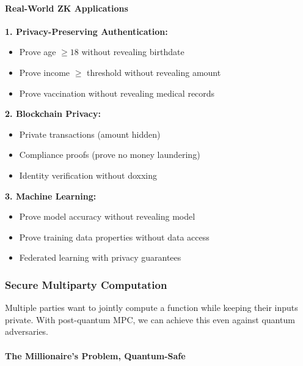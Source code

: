\documentclass[11pt,a4paper]{article}
\begin{document}
\paragraph{Real-World ZK Applications}

\textbf{1. Privacy-Preserving Authentication:}
\begin{itemize}
    \item Prove age $\geq 18$ without revealing birthdate
    \item Prove income $\geq$ threshold without revealing amount
    \item Prove vaccination without revealing medical records
\end{itemize}

\textbf{2. Blockchain Privacy:}
\begin{itemize}
    \item Private transactions (amount hidden)
    \item Compliance proofs (prove no money laundering)
    \item Identity verification without doxxing
\end{itemize}

\textbf{3. Machine Learning:}
\begin{itemize}
    \item Prove model accuracy without revealing model
    \item Prove training data properties without data access
    \item Federated learning with privacy guarantees
\end{itemize}

\subsubsection{Secure Multiparty Computation}

Multiple parties want to jointly compute a function while keeping their inputs private. With post-quantum MPC, we can achieve this even against quantum adversaries.

\paragraph{The Millionaire's Problem, Quantum-Safe}
\end{document}
